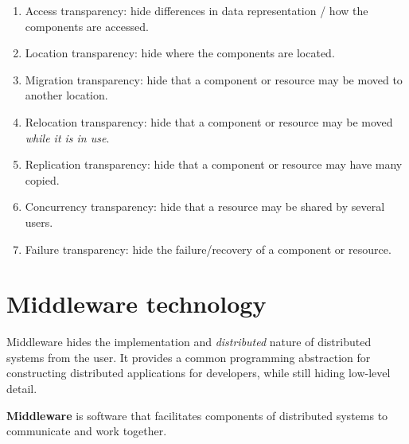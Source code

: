 \begin{example}
    \hfill
    \begin{enumerate}
        \item Access transparency:
            hide differences in data representation / how the components are 
            accessed.
            
        \item Location transparency:
            hide where the components are located.

        \item Migration transparency:
            hide that a component or resource may be moved to another location.

        \item Relocation transparency:
            hide that a component or resource may be moved
            \emph{while it is in use}.
        
        \item Replication transparency:
            hide that a component or resource may have many copied.
            
        \item Concurrency transparency:
            hide that a resource may be shared by several users.

        \item Failure transparency:
            hide the failure/recovery of a component or resource.
    \end{enumerate}
\end{example}

\chapter{Middleware technology}

Middleware hides the implementation and \emph{distributed} nature of
distributed systems from the user.
It provides a common programming abstraction for constructing distributed
applications for developers, 
while still hiding low-level detail.

\begin{definition}[Middleware]
    \textbf{Middleware} is software that facilitates components of
    distributed systems to communicate and work together.
\end{definition}

